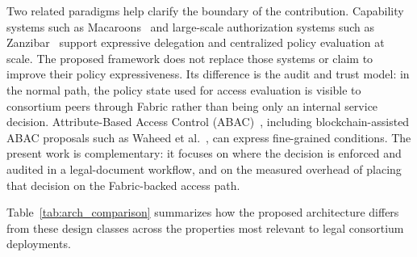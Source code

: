 \documentclass[preprint,12pt]{elsarticle}
\begin{document}
Two related paradigms help clarify the boundary of the contribution.
Capability systems such as Macaroons~\cite{macaroons2014} and
large-scale authorization systems such as Zanzibar~\cite{zanzibar2019}
support expressive delegation and centralized policy evaluation at
scale. The proposed framework does not replace those systems or claim
to improve their policy expressiveness. Its difference is the audit
and trust model: in the normal path, the policy state used for access
evaluation is visible to consortium peers through Fabric rather than being
only an internal service decision. Attribute-Based Access Control
(ABAC)~\cite{hu2014guide}, including blockchain-assisted ABAC proposals such
as Waheed et al.~\cite{waheed2025dynamicabac}, can express fine-grained
conditions. The present work is complementary: it focuses on where the
decision is enforced and audited in a legal-document workflow, and on
the measured overhead of placing that decision on the Fabric-backed
access path.

Table~\ref{tab:arch_comparison} summarizes how the proposed
architecture differs from these design classes across the
properties most relevant to legal consortium deployments.
\end{document}
